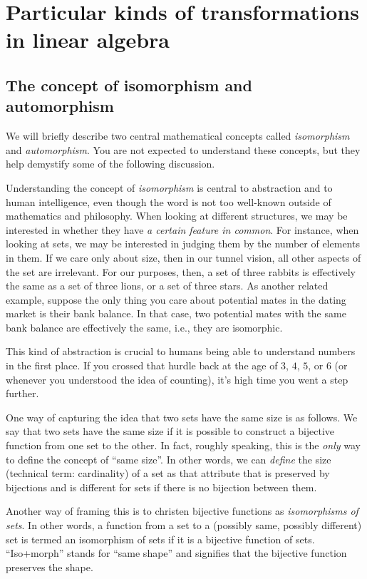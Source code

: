 \documentclass[10pt]{amsart}
\begin{document}
\section{Particular kinds of transformations in linear algebra}

\subsection{The concept of isomorphism and automorphism}

We will briefly describe two central mathematical concepts called {\em
  isomorphism} and {\em automorphism}. You are not expected to
understand these concepts, but they help demystify some of the
following discussion.

Understanding the concept of {\em isomorphism} is central to
abstraction and to human intelligence, even though the word is not too
well-known outside of mathematics and philosophy. When looking at
different structures, we may be interested in whether they have {\em a
  certain feature in common}. For instance, when looking at sets, we
may be interested in judging them by the number of elements in
them. If we care only about size, then in our tunnel vision, all other
aspects of the set are irrelevant. For our purposes, then, a set of
three rabbits is effectively the same as a set of three lions, or a
set of three stars. As another related example, suppose the only thing
you care about potential mates in the dating market is their bank
balance. In that case, two potential mates with the same bank balance
are effectively the same, i.e., they are isomorphic.

This kind of abstraction is crucial to humans being able to understand
numbers in the first place. If you crossed that hurdle back at the age
of $3$, $4$, $5$, or $6$ (or whenever you understood the idea of
counting), it's high time you went a step further.

One way of capturing the idea that two sets have the same size is as
follows. We say that two sets have the same size if it is possible to
construct a bijective function from one set to the other. In fact,
roughly speaking, this is the {\em only} way to define the concept of
``same size''. In other words, we can {\em define} the size (technical
term: cardinality) of a set as that attribute that is preserved by
bijections and is different for sets if there is no bijection between
them.

Another way of framing this is to christen bijective functions as {\em
  isomorphisms of sets}. In other words, a function from a set to a
(possibly same, possibly different) set is termed an isomorphism of
sets if it is a bijective function of sets. ``Iso+morph'' stands for
``same shape'' and signifies that the bijective function preserves the
shape.
\end{document}
